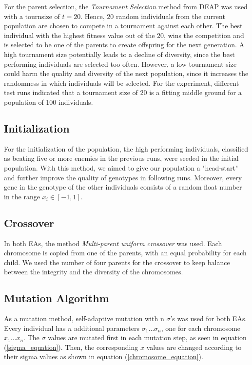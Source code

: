 For the parent selection, the \emph{Tournament Selection} method from DEAP was used with a tournsize of $t=20$. Hence, 20 random individuals from the current population are chosen to compete in a tournament against each other. The best individual with the highest fitness value out of the 20, wins the competition and is selected to be one of the parents to create offspring for the next generation. A high tournament size potentially leads to a decline of diversity, since the best performing individuals are selected too often. However, a low tournament size could harm the quality and diversity of the next population, since it increases the randomness in which individuals will be selected. For the experiment, different test runs indicated that a tournament size of 20 is a fitting middle ground for a population of 100 individuals.

\subsection{Initialization}

For the initialization of the population, the high performing individuals, classified as beating five or more enemies in the previous runs, were seeded in the initial population. With this method, we aimed to give our population a "head-start" and further improve the quality of genotypes in following runs. Moreover, every gene in the genotype of the other individuals consists of a random float number in the range $x_i \in [-1, 1]$.

\subsection{Crossover}
In both EAs, the method \emph{Multi-parent uniform crossover} was used. Each chromosome is copied from one of the parents, with an equal probability for each child. We used the number of four parents for the crossover to keep balance between the integrity and the diversity of the chromosomes.
\subsection{Mutation Algorithm}
As a mutation method, self-adaptive mutation with n $\sigma$’s was used for both EAs. Every individual has $n$ additional parameters $\sigma_1 \ldots \sigma_n$, one for each chromosome $x_1 \ldots x_n$. The $\sigma$ values are mutated first in each mutation step, as seen in equation (\ref{sigma_equation}). Then, the corresponding $x$ values are changed according to their sigma values as shown in equation (\ref{chromosome_equation}). 

